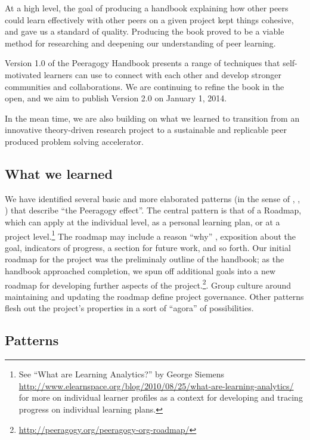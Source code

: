 \documentclass{acm_proc_article-sp}
\begin{document}
At a high level, the goal of producing a handbook explaining how other
peers could learn effectively with other peers on a given project kept
things cohesive, and gave us a standard of quality.  Producing the
book proved to be a viable method for researching and deepening our
understanding of peer learning.

Version 1.0 of the Peeragogy Handbook presents a range of techniques
that self-motivated learners can use to connect with each other and
develop stronger communities and collaborations. We are continuing to
refine the book in the open, and we aim to publish Version 2.0 on
January 1, 2014.

In the mean time, we are also building on what we learned to
transition from an innovative theory-driven research project to a
sustainable and replicable peer produced problem solving accelerator.

\subsection{What we learned}

We have identified several basic and more elaborated patterns (in the
sense of \cite{Origins}, \cite{Tales}, \cite{vlissides1995design})
that describe ``the Peeragogy effect''.  The central pattern is that
of a Roadmap, which can apply at the individual level, as a personal
learning plan, or at a project level.\footnote{See ``What are Learning
  Analytics?'' by George Siemens
  \url{http://www.elearnspace.org/blog/2010/08/25/what-are-learning-analytics/}
  for more on individual learner profiles as a context for developing
  and tracing progress on individual learning plans.} The roadmap may
include a reason ``why'' \cite{sinek2009start}, exposition about the
goal, indicators of progress, a section for future work, and so forth.
Our initial roadmap for the project was the preliminaly outline of the
handbook; as the handbook approached completion, we spun off
additional goals into a new roadmap for developing further aspects of
the project.\footnote{\url{http://peeragogy.org/peeragogy-org-roadmap/}}. Group culture around maintaining and updating the roadmap define
project governance. Other patterns flesh out the project's properties in a sort of ``agora'' of possibilities.

\subsection{Patterns} \label{patterns}
\end{document}
